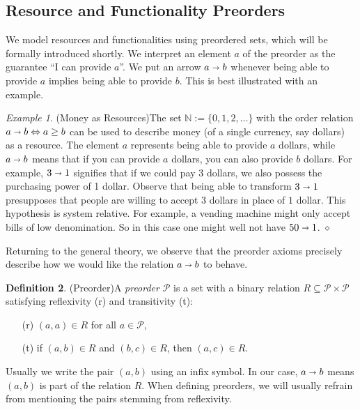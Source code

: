 \documentclass[12pt]{article}
\theoremstyle{definition}
\newtheorem{definition}{Definition}[section]
\theoremstyle{plain}
\theoremstyle{plain}
\theoremstyle{plain}
\theoremstyle{plain}
\theoremstyle{remark}
\newtheorem{example}[definition]{Example}
\newcommand\xqed[1]{%
	\leavevmode\unskip\penalty9999 \hbox{}\nobreak\hfill
	\quad\hbox{#1}}
\newcommand\exampleend{\xqed{$\diamond$}}
\theoremstyle{remark}
\newcommand{\mc}[1]{\mathcal{#1}}
\newcommand{\sub}{\subseteq}
\begin{document}
\subsection{Resource and Functionality Preorders}

We model resources and functionalities using preordered sets, which will be formally introduced shortly. We interpret an element $a$ of the preorder as the guarantee ``I can provide $a$''. We put an arrow $a \shortrightarrow b$ whenever being able to provide $a$ implies being able to provide $b$. This is best illustrated with an example.

\begin{example}(Money as Resources)\label{ex:money}
	The set $\mathbb{N} := \{0,1,2,\ldots \}$ with the order relation $a \shortrightarrow b \Leftrightarrow a \geq b$ can be used to describe money (of a single currency, say dollars) as a resource. The element $a$ represents being able to provide $a$ dollars, while $a \shortrightarrow b$ means that if you can provide $a$ dollars, you can also provide $b$ dollars. For example, $3 \shortrightarrow 1$ signifies that if we could pay 3 dollars, we also possess the purchasing power of 1 dollar. Observe that being able to transform $3 \shortrightarrow 1$ presupposes that people are willing to accept $3$ dollars in place of $1$ dollar. This hypothesis is system relative. For example, a vending machine might only accept bills of low denomination. So in this case one might well not have $50 \shortrightarrow 1$. \exampleend
\end{example}

Returning to the general theory, we observe that the preorder axioms precisely describe how we would like the relation $a \shortrightarrow b$ to behave.

\begin{definition}(Preorder)\label{def:preorder}
	A \emph{preorder} $\mc{P}$ is a set with a binary relation $R \sub \mc{P} \times \mc{P}$ satisfying reflexivity (r) and transitivity (t):
	\begin{itemize}
		\item[(r)] $(a,a) \in R$ for all $a \in \mc{P}$,
		\item[(t)] if $(a,b) \in R$ and $(b,c) \in R$, then $(a,c) \in R$.
	\end{itemize}
	Usually we write the pair $(a,b)$ using an infix symbol. In our case, $a \shortrightarrow b$ means $(a,b)$ is part of the relation $R$. When defining preorders, we will usually refrain from mentioning the pairs stemming from reflexivity.
\end{definition}
\end{document}
